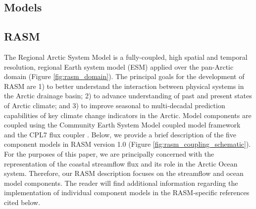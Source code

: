 \documentclass[jgrga, draft]{agutex}
\begin{document}
\begin{article}
\section{Models}
\label{sec:models}

\subsection{RASM}
\label{sec:rasm}
The Regional Arctic System Model is a fully-coupled, high spatial and temporal resolution, regional Earth system model (ESM) applied over the pan-Arctic domain (Figure \ref{fig:rasm_domain}).
The principal goals for the development of RASM are 1) to better understand the interaction between physical systems in the Arctic drainage basin; 2) to advance understanding of past and present states of Arctic climate; and 3) to improve seasonal to multi-decadal prediction capabilities of key climate change indicators in the Arctic.
Model components are coupled using the Community Earth System Model \citep[CESM; ][]{Hurrell_2013} coupled model framework and the CPL7 flux coupler \citep{Craig_2011}.
Below, we provide a brief description of the five component models in RASM version 1.0 (Figure \ref{fig:rasm_coupling_schematic}).
For the purposes of this paper, we are principally concerned with the representation of the coastal streamflow flux and its role in the Arctic Ocean system.
Therefore, our RASM description focuses on the streamflow and ocean model components.
The reader will find additional information regarding the implementation of individual component models in the RASM-specific references cited below.


\end{article}
\end{document}
